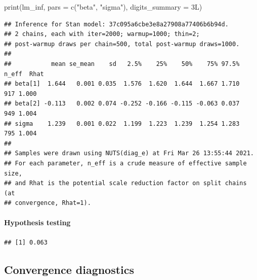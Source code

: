 \documentclass[
  11pt,
]{article}
\newenvironment{Shaded}{\begin{snugshade}}{\end{snugshade}}
\newcommand{\AttributeTok}[1]{\textcolor[rgb]{0.77,0.63,0.00}{#1}}
\newcommand{\CommentTok}[1]{\textcolor[rgb]{0.56,0.35,0.01}{\textit{#1}}}
\newcommand{\DecValTok}[1]{\textcolor[rgb]{0.00,0.00,0.81}{#1}}
\newcommand{\FunctionTok}[1]{\textcolor[rgb]{0.00,0.00,0.00}{#1}}
\newcommand{\NormalTok}[1]{#1}
\newcommand{\OtherTok}[1]{\textcolor[rgb]{0.56,0.35,0.01}{#1}}
\newcommand{\SpecialCharTok}[1]{\textcolor[rgb]{0.00,0.00,0.00}{#1}}
\newcommand{\StringTok}[1]{\textcolor[rgb]{0.31,0.60,0.02}{#1}}
\begin{document}
\begin{Shaded}
\begin{Highlighting}[]
\FunctionTok{print}\NormalTok{(lm\_inf,}
      \AttributeTok{pars =} \FunctionTok{c}\NormalTok{(}\StringTok{"beta"}\NormalTok{, }\StringTok{"sigma"}\NormalTok{),}
      \AttributeTok{digits\_summary =}\NormalTok{ 3L)}
\end{Highlighting}
\end{Shaded}

\begin{verbatim}
## Inference for Stan model: 37c095a6cbe3e8a27908a77406b6b94d.
## 2 chains, each with iter=2000; warmup=1000; thin=2; 
## post-warmup draws per chain=500, total post-warmup draws=1000.
## 
##           mean se_mean    sd   2.5%    25%    50%    75% 97.5% n_eff  Rhat
## beta[1]  1.644   0.001 0.035  1.576  1.620  1.644  1.667 1.710   917 1.000
## beta[2] -0.113   0.002 0.074 -0.252 -0.166 -0.115 -0.063 0.037   949 1.004
## sigma    1.239   0.001 0.022  1.199  1.223  1.239  1.254 1.283   795 1.004
## 
## Samples were drawn using NUTS(diag_e) at Fri Mar 26 13:55:44 2021.
## For each parameter, n_eff is a crude measure of effective sample size,
## and Rhat is the potential scale reduction factor on split chains (at 
## convergence, Rhat=1).
\end{verbatim}

\hypertarget{hypothesis-testing}{%
\paragraph{Hypothesis testing}\label{hypothesis-testing}}

\begin{Shaded}
\end{Shaded}

\begin{verbatim}
## [1] 0.063
\end{verbatim}

\hypertarget{convergence-diagnostics}{%
\subsection{Convergence diagnostics}\label{convergence-diagnostics}}
\end{document}
